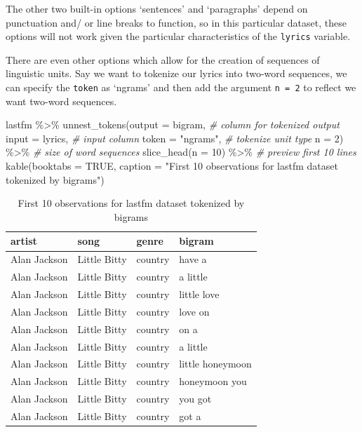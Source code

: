 \documentclass[
]{article}
\newenvironment{Shaded}{\begin{snugshade}}{\end{snugshade}}
\newcommand{\AttributeTok}[1]{\textcolor[rgb]{0.77,0.63,0.00}{#1}}
\newcommand{\CommentTok}[1]{\textcolor[rgb]{0.56,0.35,0.01}{\textit{#1}}}
\newcommand{\ConstantTok}[1]{\textcolor[rgb]{0.00,0.00,0.00}{#1}}
\newcommand{\DecValTok}[1]{\textcolor[rgb]{0.00,0.00,0.81}{#1}}
\newcommand{\FunctionTok}[1]{\textcolor[rgb]{0.00,0.00,0.00}{#1}}
\newcommand{\NormalTok}[1]{#1}
\newcommand{\SpecialCharTok}[1]{\textcolor[rgb]{0.00,0.00,0.00}{#1}}
\newcommand{\StringTok}[1]{\textcolor[rgb]{0.31,0.60,0.02}{#1}}
\begin{document}
The other two built-in options `sentences' and `paragraphs' depend on punctuation and/ or line breaks to function, so in this particular dataset, these options will not work given the particular characteristics of the \texttt{lyrics} variable.

There are even other options which allow for the creation of sequences of linguistic units. Say we want to tokenize our lyrics into two-word sequences, we can specify the \texttt{token} as `ngrams' and then add the argument \texttt{n\ =\ 2} to reflect we want two-word sequences.

\begin{Shaded}
\begin{Highlighting}[]
\NormalTok{lastfm }\SpecialCharTok{\%\textgreater{}\%} 
  \FunctionTok{unnest\_tokens}\NormalTok{(}\AttributeTok{output =}\NormalTok{ bigram, }\CommentTok{\# column for tokenized output}
                \AttributeTok{input =}\NormalTok{ lyrics, }\CommentTok{\# input column}
                \AttributeTok{token =} \StringTok{"ngrams"}\NormalTok{, }\CommentTok{\# tokenize unit type}
                \AttributeTok{n =} \DecValTok{2}\NormalTok{) }\SpecialCharTok{\%\textgreater{}\%}  \CommentTok{\# size of word sequences }
  \FunctionTok{slice\_head}\NormalTok{(}\AttributeTok{n =} \DecValTok{10}\NormalTok{) }\SpecialCharTok{\%\textgreater{}\%}  \CommentTok{\# preview first 10 lines}
  \FunctionTok{kable}\NormalTok{(}\AttributeTok{booktabs =} \ConstantTok{TRUE}\NormalTok{,}
        \AttributeTok{caption =} \StringTok{"First 10 observations for lastfm dataset tokenized by bigrams"}\NormalTok{)}
\end{Highlighting}
\end{Shaded}

\begin{table}

\caption{\label{tab:td-lastfm-tokenize-bigrams}First 10 observations for lastfm dataset tokenized by bigrams}
\centering
\begin{tabular}[t]{llll}
\toprule
artist & song & genre & bigram\\
\midrule
Alan Jackson & Little Bitty & country & have a\\
Alan Jackson & Little Bitty & country & a little\\
Alan Jackson & Little Bitty & country & little love\\
Alan Jackson & Little Bitty & country & love on\\
Alan Jackson & Little Bitty & country & on a\\
\addlinespace
Alan Jackson & Little Bitty & country & a little\\
Alan Jackson & Little Bitty & country & little honeymoon\\
Alan Jackson & Little Bitty & country & honeymoon you\\
Alan Jackson & Little Bitty & country & you got\\
Alan Jackson & Little Bitty & country & got a\\
\bottomrule
\end{tabular}
\end{table}
\end{document}
